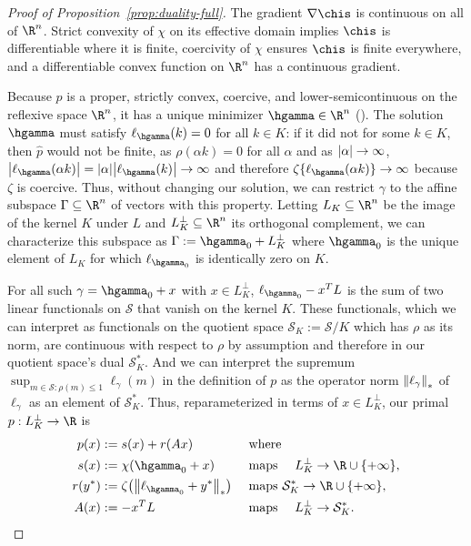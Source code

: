 \documentclass{article}
\newcommand{\calS}{\mathcal{S}}
\begin{document}
\begin{proof}[Proof of
Proposition~\ref{prop:duality-full}]
The gradient $\nabla\chis$ is continuous on all of $\R^n$. Strict convexity of $\chi$ on its effective domain implies $\chis$ is differentiable where it is finite, coercivity of $\chi$ ensures $\chis$ is finite everywhere, and a differentiable convex function on $\R^n$ has a continuous gradient.

Because $p$ is a proper, strictly convex, coercive, and lower-semicontinuous on the reflexive space $\R^n$, it has a unique minimizer $\hgamma \in \R^n$ (). The solution $\hgamma$ must satisfy $\ell_{\hgamma}(k)=0$ for all $k \in K$:
if it did not for some $k \in K$, then $\hat p$ would not be finite, as $\rho(\alpha k) = 0$ for all $\alpha$ and as $\abs{\alpha} \to \infty$, $\abs{\ell_{\hgamma}(\alpha k)} = \abs{\alpha}\abs{\ell_{\hgamma}(k)}\to \infty$ and therefore $\zeta\{\ell_{\hgamma}(\alpha k)\} \to \infty$ because $\zeta$ is coercive. Thus, without changing our solution, we can restrict $\gamma$ to the affine subspace $\Gamma \subseteq \R^n$ of vectors with this property. Letting $L_K \subseteq \R^n$ be the image of the kernel $K$ under $L$ and $L_K^{\perp}\subseteq \R^n$ its orthogonal complement, we can characterize this subspace as $\Gamma := \hgamma_0 + L_K^\perp$ where $\hgamma_0$ is the unique element of $L_K$ for which $\ell_{\hgamma_0}$ is identically zero on $K$.

For all such $\gamma=\hgamma_0 + x$ with $x \in L_K^\perp$, $\ell_{\hgamma_0} - x^T L$
is the sum of two linear functionals on $\calS$ that vanish on the kernel $K$. These functionals, which we can
interpret as functionals on the quotient space $\calS_K := \calS / K$ which has $\rho$ as its norm, are continuous with respect
to $\rho$ by assumption and therefore in our quotient space's dual $\calS_K^*$. And we can
interpret the supremum $\sup_{m \in \calS : \rho(m) \le 1} \ell_\gamma (m)$ in the definition of $p$ as the
operator norm $\norm{\ell_\gamma}_*$ of $\ell_\gamma$ as an element of $\calS_K^*$. Thus, reparameterized in terms of $x \in L_K^\perp$, our primal $p : L_K^\perp \to \R$ is
\begin{equation}
\label{eq:fr-primal}
\begin{aligned}
p(x) &:= s(x) + r(Ax)
&& \text{ where } \\
s(x) &:= \chi\qty( \hgamma_{0} + x )
&&\text{ maps } \quad L_K^\perp \to \R \cup \{+\infty\}, \\
r(y^*) &:= \zeta\qty( \norm{\ell_{\hgamma_0} + y^* }_* )
&& \text{ maps } \calS_K^* \to \R \cup \{+\infty\}, \\
A(x) &:= -x^T L
&& \text{ maps } \quad L_K^\perp \to \calS_K^*.
\end{aligned}
\end{equation}



\end{proof}
\end{document}
